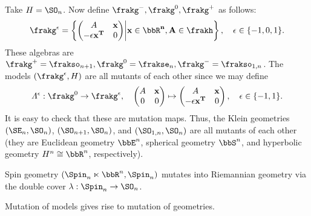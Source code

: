 \begin{example}
    Take $H=\SO_n$. Now define $\frakg^-,\frakg^0,\frakg^+$ as follows:
    \[\frakg^\epsilon=\left\{
        \begin{pmatrix}
            A & \bf{x}\\
            -\epsilon\bf{x}^T & 0
        \end{pmatrix}\middle| \bf{x}\in\bbR^n,A\in\frakh
    \right\},\quad \epsilon\in \{-1,0,1\}.\]
    These algebras are $\frakg^+=\frakso_{n+1},\frakg^0=\frakse_n,\frakg^-=\frakso_{1,n}$. The models $(\frakg^\epsilon,H)$ are all mutants of each other since we may define 
    \[\varLambda^\epsilon:\frakg^0\to \frakg^\epsilon,\quad 
    \begin{pmatrix}
        A & \bf{x}\\
        0 & 0
\end{pmatrix}\mapsto 
\begin{pmatrix}
    A & \bf{x}\\
    -\epsilon\bf{x}^T & 0
\end{pmatrix},\quad \epsilon\in\{-1,1\}.
    \]
    It is easy to check that these are mutation maps. Thus, the Klein geometries $(\SE_n,\SO_n)$, $(\SO_{n+1},\SO_n)$, and $(\SO_{1,n},\SO_n)$ are all mutants of each other (they are Euclidean geometry $\bbE^n$, spherical geometry $\bbS^n$, and hyperbolic geometry $H^n\cong\bbR^n$, respectively).
\end{example}

\begin{example}
    Spin geometry $(\Spin_{n}\ltimes\bbR^n,\Spin_n)$ mutates into Riemannian geometry via the double cover $\lambda:\Spin_n\to \SO_n$.
\end{example}


Mutation of models gives rise to mutation of geometries.

